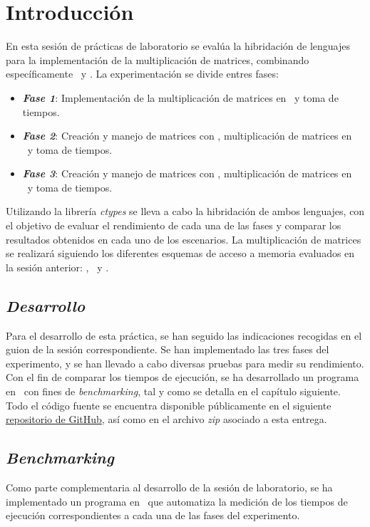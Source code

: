 \pagestyle{fancy}
\fancyhead[l]{\autorUO}
\fancyfoot[l]{\asignaturaAbbr}
\fancyfoot[r]{\fecha}

\section{Introducción}
En esta sesión de prácticas de laboratorio se evalúa la hibridación de lenguajes para la implementación de la multiplicación de matrices, 
combinando específicamente \C\ y \python. La experimentación se divide entres fases:
\vspace{0.15cm}
\begin{itemize}
    \item \textit{\textbf{Fase 1}}: Implementación de la multiplicación de matrices en \python\ y toma de tiempos.
    \item \textit{\textbf{Fase 2}}: Creación y manejo de matrices con \python, multiplicación de matrices en \C\ y toma de tiempos.
    \item \textit{\textbf{Fase 3}}: Creación y manejo de matrices con \C, multiplicación de matrices en \C\ y toma de tiempos.
\end{itemize}
\vspace{0.15cm}
Utilizando la librería \textit{ctypes} se lleva a cabo la hibridación de ambos lenguajes, con el objetivo de evaluar el rendimiento de 
cada una de las fases y comparar los resultados obtenidos en cada uno de los escenarios. La multiplicación de matrices se realizará 
siguiendo los diferentes esquemas de acceso a memoria evaluados en la sesión anterior: \rowmajor, \colmajor\ y \zorder.

\subsection{\textit{Desarrollo}}
Para el desarrollo de esta práctica, se han seguido las indicaciones recogidas en el guion de la sesión correspondiente. 
Se han implementado las tres fases del experimento, y se han llevado a cabo diversas pruebas para medir su rendimiento.
Con el fin de comparar los tiempos de ejecución, se ha desarrollado un programa en \python\ con fines de \textit{benchmarking}, 
tal y como se detalla en el capítulo siguiente. Todo el código fuente se encuentra disponible públicamente en el siguiente 
\href{https://github.com/rubennmg/CAP/tree/main/sesion2}{repositorio de GitHub}, así como en el archivo \textit{zip} asociado a esta entrega.
\subsection{\textit{Benchmarking}}
Como parte complementaria al desarrollo de la sesión de laboratorio, se ha implementado un programa en \python\ que automatiza la medición de 
los tiempos de ejecución correspondientes a cada una de las fases del experimento.

